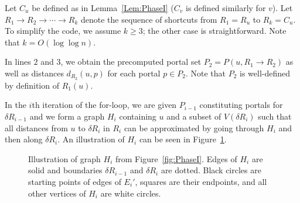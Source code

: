 \documentclass[11pt]{article}
\begin{document}
Let $C_u$ be defined as in Lemma~\ref{Lem:PhaseI} ($C_v$ is defined similarly for $v$). Let $R_1\rightarrow R_2\rightarrow\cdots\rightarrow R_k$ denote the sequence of shortcuts from $R_1 = R_u$ to $R_k = C_u$. To simplify the code, we assume $k\geq 3$; the other case is straightforward. Note that $k = O(\log\log n)$.

In lines $2$ and $3$, we obtain the precomputed portal set $P_2 = P(u,R_1\rightarrow R_2)$ as well as distances $d_{R_2}(u,p)$ for each portal $p\in P_2$. Note that $P_2$ is well-defined by definition of $R_1(u)$.

In the $i$th iteration of the for-loop, we are given $P_{i-1}$ constituting portals for $\delta R_{i-1}$ and we form a graph $H_i$ containing $u$ and a subset of $V(\delta R_i)$ such that all distances from $u$ to $\delta R_i$ in $R_i$ can be approximated by going through $H_i$ and then along $\delta R_i$. An illustration of $H_i$ can be seen in Figure~\ref{fig:HiPhaseIData}.
\begin{figure}\centerline{}
\caption{Illustration of graph $H_i$ from Figure~\ref{fig:PhaseI}. Edges of $H_i$ are solid and boundaries $\delta R_{i-1}$ and $\delta R_i$ are dotted. Black circles are starting points of edges of $E_i'$, squares are their endpoints, and all other vertices of $H_i$ are white circles.}
\label{fig:HiPhaseIData}
\end{figure}
\end{document}
